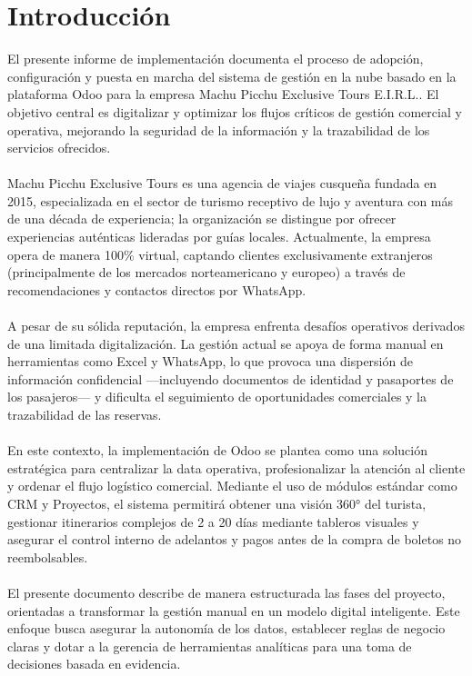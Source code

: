 \section{Introducción}

El presente informe de implementación documenta el proceso de adopción, configuración y puesta en marcha del sistema de gestión en la nube basado en la plataforma Odoo para la empresa Machu Picchu Exclusive Tours E.I.R.L.. El objetivo central es digitalizar y optimizar los flujos críticos de gestión comercial y operativa, mejorando la seguridad de la información y la trazabilidad de los servicios ofrecidos.
\\
\\
Machu Picchu Exclusive Tours es una agencia de viajes cusqueña fundada en 2015, especializada en el sector de turismo receptivo de lujo y aventura con más de una década de experiencia; la organización se distingue por ofrecer experiencias auténticas lideradas por guías locales. Actualmente, la empresa opera de manera 100\% virtual, captando clientes exclusivamente extranjeros (principalmente de los mercados norteamericano y europeo) a través de recomendaciones y contactos directos por WhatsApp.
\\
\\
A pesar de su sólida reputación, la empresa enfrenta desafíos operativos derivados de una limitada digitalización. La gestión actual se apoya de forma manual en herramientas como Excel y WhatsApp, lo que provoca una dispersión de información confidencial ---incluyendo documentos de identidad y pasaportes de los pasajeros--- y dificulta el seguimiento de oportunidades comerciales y la trazabilidad de las reservas.
\\
\\
En este contexto, la implementación de Odoo se plantea como una solución estratégica para centralizar la data operativa, profesionalizar la atención al cliente y ordenar el flujo logístico comercial. Mediante el uso de módulos estándar como CRM y Proyectos, el sistema permitirá obtener una visión 360° del turista, gestionar itinerarios complejos de 2 a 20 días mediante tableros visuales y asegurar el control interno de adelantos y pagos antes de la compra de boletos no reembolsables.
\\
\\
El presente documento describe de manera estructurada las fases del proyecto, orientadas a transformar la gestión manual en un modelo digital inteligente. Este enfoque busca asegurar la autonomía de los datos, establecer reglas de negocio claras y dotar a la gerencia de herramientas analíticas para una toma de decisiones basada en evidencia.
